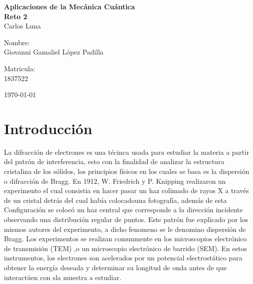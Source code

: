 \documentclass[reprint,amsmath,amssymb,aps,]{revtex4-2}
\begin{document}
\begin{titlepage}
\begin{center}
\vspace*{2cm}
\begin{large}
\vspace{1cm}
\large{\textbf{Aplicaciones de la Mecánica Cuántica}}\vspace{1.5cm}\\
\textbf{Reto 2}\\
Carlos Luna\\
\end{large}
\vspace{3.5cm}
\begin{minipage}{0.6\linewidth}
\vspace{0.5cm}
\changefontsizes{14pt}
Nombre:\\
Giovanni Gamaliel López Padilla\\
\end{minipage}
\begin{minipage}{0.2\linewidth}
\changefontsizes{14pt}
Matricula:\\
1837522\\
\end{minipage}
\end{center}
\vspace{4cm}
\begin{flushright}
\today
\end{flushright}
\pagebreak
\end{titlepage}
\maketitle
\section{Introducción}
La difracción de electrones es una t\'ecinca usada para estudiar la 
materia a partir del patr\'on  de interferencia, esto con la finalidad de 
analizar la estructura cristalina de los s\'olidos, los principios físicos en los cuales se basa es la 
dispersión o difracción de Bragg. En 1912, W. Friedrich y P. Knipping realizaron un experimento el cual consistia en
hacer pasar un haz colimado de rayos X a través de un cristal detrás del cual había colocadouna fotografía, además de esta Configuración
se colocó un haz central que corresponde a la dirección incidente observando una distribución regular de puntos. Este patrón fue explicado por los mismos autores
del experimento, a dicho fenomeno se le denomino dispersión de Bragg. Los experimentos se realizan comunmente en los microscopios electrónico de transmisión (TEM)
,o un microscopio electrónico de barrido (SEM). En estos instrumentos, los electrones son acelerados por un potencial electrostático para obtener la energía deseada
y determinar su longitud de onda antes de que interactúen con sla muestra a estudiar. 
\vspace{-0.7cm}
\end{document}
